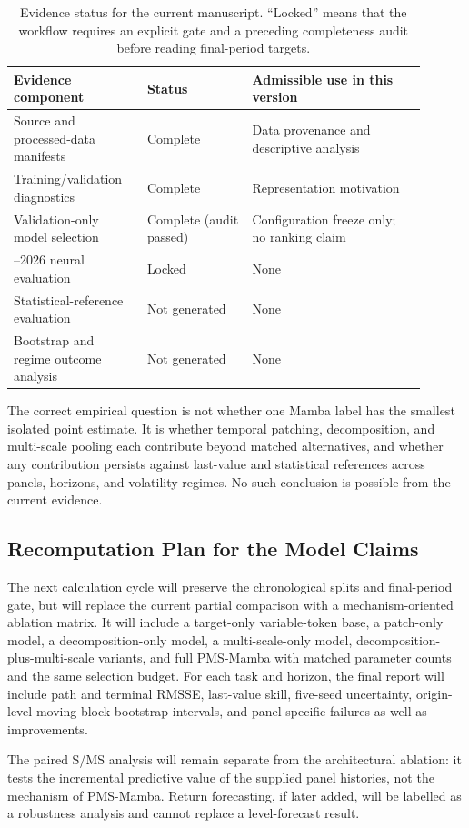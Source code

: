\begin{table}[H]
\centering
\caption{Evidence status for the current manuscript. ``Locked'' means that the workflow requires an explicit gate and a preceding completeness audit before reading final-period targets.}
\label{tab:evidence-status}
{\small
\begin{tabular}{>{\raggedright\arraybackslash}p{0.29\linewidth}>{\raggedright\arraybackslash}p{0.23\linewidth}>{\raggedright\arraybackslash}p{0.38\linewidth}}
\toprule
Evidence component & Status & Admissible use in this version \\
\midrule
Source and processed-data manifests & Complete & Data provenance and descriptive analysis \\
Training/validation diagnostics & Complete & Representation motivation \\
Validation-only model selection & Complete (audit passed) & Configuration freeze only; no ranking claim \\
2023--2026 neural evaluation & Locked & None \\
Statistical-reference evaluation & Not generated & None \\
Bootstrap and regime outcome analysis & Not generated & None \\
\bottomrule
\end{tabular}
}
\end{table}

The correct empirical question is not whether one Mamba label has the smallest isolated point estimate.
It is whether temporal patching, decomposition, and multi-scale pooling each contribute beyond matched alternatives, and whether any contribution persists against last-value and statistical references across panels, horizons, and volatility regimes.
No such conclusion is possible from the current evidence.

\subsection{Recomputation Plan for the Model Claims}

The next calculation cycle will preserve the chronological splits and final-period gate, but will replace the current partial comparison with a mechanism-oriented ablation matrix.
It will include a target-only variable-token base, a patch-only model, a decomposition-only model, a multi-scale-only model, decomposition-plus-multi-scale variants, and full PMS-Mamba with matched parameter counts and the same selection budget.
For each task and horizon, the final report will include path and terminal RMSSE, last-value skill, five-seed uncertainty, origin-level moving-block bootstrap intervals, and panel-specific failures as well as improvements.

The paired S/MS analysis will remain separate from the architectural ablation: it tests the incremental predictive value of the supplied panel histories, not the mechanism of PMS-Mamba.
Return forecasting, if later added, will be labelled as a robustness analysis and cannot replace a level-forecast result.
